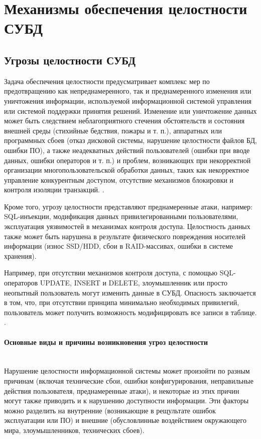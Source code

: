 \section{Механизмы обеспечения целостности СУБД}

\subsection{Угрозы целостности СУБД}
Задача обеспечения целостности предусматривает комплекс мер по предотвращению как непреднамеренного, так и преднамеренного изменения или уничтожения информации, используемой информационной системой управления или системой поддержки принятия решений. Изменение или уничтожение данных может быть следствием неблагоприятного стечения обстоятельств и состояния внешней среды (стихийные бедствия, пожары и т. п.), аппаратных или программных сбоев (отказ дисковой системы, нарушение целостности файлов БД, ошибки ПО), а также неадекватных действий пользователей (ошибки при вводе данных, ошибки операторов и т. п.) и проблем, возникающих при некорректной организации многопользовательской обработки данных, таких как некорректное управление конкурентным доступом, отсутствие механизмов блокировки и контроля изоляции транзакций. \autocite{Lihonosov2011, postgredoc1}.

Кроме того, угрозу целостности представляют преднамеренные атаки, например: SQL-инъекции, модификация данных привилегированными пользователями, эксплуатация уязвимостей в механизмах контроля доступа. Целостность данных также может быть нарушена в результате физического повреждения носителей информации (износ SSD/HDD, сбои в RAID-массивах, ошибки в системе хранения).

Например, при отсутствии механизмов контроля доступа, с помощью SQL-операторов UPDATE, INSERT и DELETE, злоумышленник или просто неопытный пользователь могут изменить данные в СУБД. Опасность заключается в том, что, при отсутствии принципа минимально необходимых привилегий, пользователь может получить возможность модифицировать все записи в таблице.  \autocite{Utebov2008, nist80012}.

\paragraph{Основные виды и причины возникновения угроз целостности} ~\\

Нарушение целостности информационной системы может произойти по разным причинам (включая технические сбои, ошибки конфигурирования, неправильные действия пользователя, преднамеренные атаки), и некоторые из этих причин могут также приводить и к нарушению доступности информации. 
Эти факторы можно разделить на внутренние (возникающие в рещультате ошибок эксплуатации или ПО) и внешние (обусловлинные воздействием окружающего мира, злоумышленников, технических сбоев).

